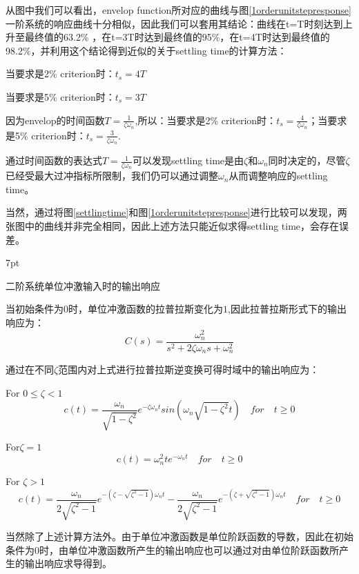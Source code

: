 \documentclass{article}
\numberwithin{equation}{section}
\numberwithin{figure}{section}
\newenvironment{formal}{%
\def\FrameCommand{%
\hspace{1pt}%
{\color{DarkBlue}\vrule width 2pt}%
{\color{formalshade}\vrule width 4pt}%
\colorbox{formalshade}%
}%
\MakeFramed{\advance\hsize-\width\FrameRestore}%
\noindent\hspace{-4.55pt}%
\begin{adjustwidth}{}{7pt}%
\vspace{2pt}\vspace{2pt}%
}
{%
\vspace{2pt}\end{adjustwidth}\endMakeFramed%
}
\begin{document}
从图中我们可以看出，envelop function所对应的曲线与图\ref{1orderunitstepresponse}一阶系统的响应曲线十分相似，因此我们可以套用其结论：曲线在t=T时刻达到上升至最终值的63.2\% ，在t=3T时达到最终值的95\%，在t=4T时达到最终值的98.2\%，并利用这个结论得到近似的关于settling time的计算方法：

当要求是2\% criterion时：$t_s=4T$

当要求是5\% criterion时：$t_s=3T$

因为envelop的时间函数$T=\frac{1}{\zeta\omega_n}$,所以：当要求是2\% criterion时：$t_s=\frac{4}{\zeta\omega_n}$；当要求是5\% criterion时：$t_s=\frac{3}{\zeta\omega_n}$.

通过时间函数的表达式$T=\frac{1}{\zeta\omega_n}$可以发现settling time是由$\zeta$和$\omega_n$同时决定的，尽管$\zeta$已经受最大过冲指标所限制，我们仍可以通过调整$\omega_n$从而调整响应的settling time。

当然，通过将图\ref{settlingtime}和图\ref{1orderunitstepresponse}进行比较可以发现，两张图中的曲线并非完全相同，因此上述方法只能近似求得settling time，会存在误差。

\begin{formal}
    二阶系统单位冲激输入时的输出响应
\end{formal}
当初始条件为0时，单位冲激函数的拉普拉斯变化为$1$,因此拉普拉斯形式下的输出响应为：
\begin{equation}
    C(s)=\frac{\omega_n^2}{s^2+2\zeta\omega_ns+\omega_n^2}
\end{equation}

通过在不同$\zeta$范围内对上式进行拉普拉斯逆变换可得时域中的输出响应为：

For $0≤\zeta<1$
\begin{equation}
    c(t)=\frac{\omega_n}{\sqrt{1-\zeta^2}}e^{-\zeta\omega_nt}sin(\omega_n\sqrt{1-\zeta^2}t) \quad for \quad t≥0
\end{equation}

For$\zeta=1$
\begin{equation}
    c(t)=\omega_n^2te^{-\omega_nt} \quad for \quad t≥0
\end{equation}

For $\zeta>1$
\begin{equation}
    c(t)=\frac{\omega_n}{2\sqrt{\zeta^2-1}}e^{-(\zeta-\sqrt{\zeta^2-1})\omega_nt}-\frac{\omega_n}{2\sqrt{\zeta^2-1}}e^{-(\zeta+\sqrt{\zeta^2-1})\omega_nt}\quad for \quad t≥0
\end{equation}

当然除了上述计算方法外。由于单位冲激函数是单位阶跃函数的导数，因此在初始条件为0时，由单位冲激函数所产生的输出响应也可以通过对由单位阶跃函数所产生的输出响应求导得到。
\end{document}

